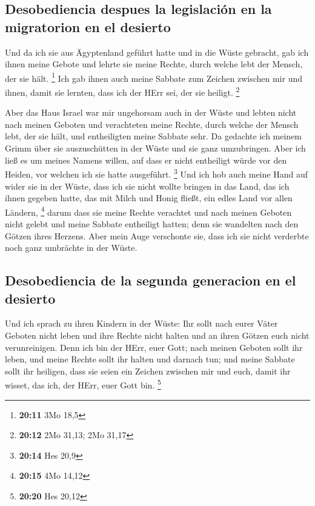 \hypertarget{desobediencia-despues-la-legislaciuxf3n-en-la-migratorion-en-el-desierto}{%
\subsection{Desobediencia despues la legislación en la migratorion en el
desierto}\label{desobediencia-despues-la-legislaciuxf3n-en-la-migratorion-en-el-desierto}}

 Und da ich sie aus Ägyptenland geführt hatte und in die
Wüste gebracht,  gab ich ihnen meine Gebote und lehrte
sie meine Rechte, durch welche lebt der Mensch, der sie hält.
\footnote{\textbf{20:11} 3Mo 18,5}  Ich gab ihnen auch
meine Sabbate zum Zeichen zwischen mir und ihnen, damit sie lernten,
dass ich der HErr sei, der sie heiligt. \footnote{\textbf{20:12} 2Mo
  31,13; 2Mo 31,17}

 Aber das Haus Israel war mir ungehorsam auch in der
Wüste und lebten nicht nach meinen Geboten und verachteten meine Rechte,
durch welche der Mensch lebt, der sie hält, und entheiligten meine
Sabbate sehr. Da gedachte ich meinem Grimm über sie auszuschütten in der
Wüste und sie ganz umzubringen.  Aber ich ließ es um
meines Namens willen, auf dass er nicht entheiligt würde vor den Heiden,
vor welchen ich sie hatte ausgeführt. \footnote{\textbf{20:14} Hes 20,9}
 Und ich hob auch meine Hand auf wider sie in der Wüste,
dass ich sie nicht wollte bringen in das Land, das ich ihnen gegeben
hatte, das mit Milch und Honig fließt, ein edles Land vor allen Ländern,
\footnote{\textbf{20:15} 4Mo 14,12}  darum dass sie meine
Rechte verachtet und nach meinen Geboten nicht gelebt und meine Sabbate
entheiligt hatten; denn sie wandelten nach den Götzen ihres Herzens.
 Aber mein Auge verschonte sie, dass ich sie nicht
verderbte noch ganz umbrächte in der Wüste.

\hypertarget{desobediencia-de-la-segunda-generacion-en-el-desierto}{%
\subsection{Desobediencia de la segunda generacion en el
desierto}\label{desobediencia-de-la-segunda-generacion-en-el-desierto}}

 Und ich sprach zu ihren Kindern in der Wüste: Ihr sollt
nach eurer Väter Geboten nicht leben und ihre Rechte nicht halten und an
ihren Götzen euch nicht verunreinigen.  Denn ich bin der
HErr, euer Gott; nach meinen Geboten sollt ihr leben, und meine Rechte
sollt ihr halten und darnach tun;  und meine Sabbate
sollt ihr heiligen, dass sie seien ein Zeichen zwischen mir und euch,
damit ihr wisset, das ich, der HErr, euer Gott bin. \footnote{\textbf{20:20}
  Hes 20,12}

